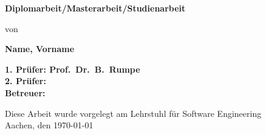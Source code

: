 \begin{titlepage}
\begin{flushleft}
{    {\Large \textbf{Diplomarbeit/Masterarbeit/Studienarbeit}\\}
		\vspace{3em} 
		
		{\large von\\} %
    
    {\LARGE \textbf{Name, Vorname}\\}
    \vspace{3em} 
		    
    {\Large \textbf{1. Prüfer: Prof.\ Dr.\ B.\ Rumpe}\\}
    \vspace{1em} 
    {\Large \textbf{2. Prüfer: }\\}
    \vspace{1em} 
    {\Large \textbf{Betreuer: }\\}
    \vspace{7em} 

    {\large Diese Arbeit wurde vorgelegt am Lehrstuhl für Software Engineering \\}
    \vspace{1em}
		{\large	Aachen, den \today\\}
  }
\end{flushleft}

\end{titlepage}





